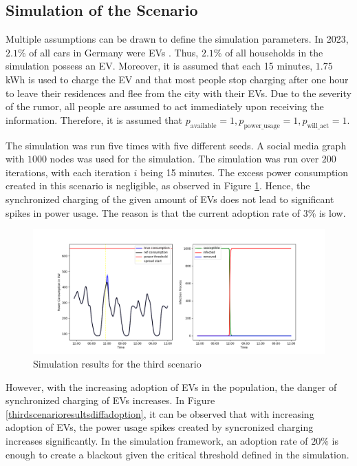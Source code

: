 \subsection{Simulation of the Scenario}

Multiple assumptions can be drawn to define the simulation parameters. 
In 2023, $2.1\%$ of all cars in Germany were 
EVs \cite{evadoption}. Thus, $2.1\%$ of all households in the simulation
possess an EV. Moreover, it is assumed that 
each 15 minutes, $1.75$kWh is used to charge the EV 
and that most people stop charging after one hour
to leave their residences and flee from the city with their EVs.
Due to the severity of the rumor,
all people are assumed to act immediately upon 
receiving the information. Therefore, it is assumed 
that $p_{\mathrm{available}}=1, 
p_{\mathrm{power\_usage}}=1, p_{\mathrm{will\_act}}=1$.


The simulation was run five times with five different seeds. 
A social media graph with $1000$ nodes was used for the simulation. 
The simulation was run over $200$ iterations, with each
iteration $i$ being 15 minutes.
The excess power consumption created in this scenario is negligible, 
as observed in Figure \ref{thirdscenarioresults}.  Hence, the 
synchronized charging of the given amount of EVs does not
lead to significant spikes in power usage.
The reason is that the current adoption rate of $3\%$ is low.

\begin{figure}[!ht]
    \center
    \includegraphics[scale=.5]{figs/eval/scenario3/scenario3basic.png}
    \caption{Simulation results for the third scenario}
    \label{thirdscenarioresults}
\end{figure}

However, with the increasing adoption of EVs in the 
population, the danger of synchronized charging 
of EVs increases. In Figure \ref{thirdscenarioresultsdiffadoption},
it can be observed that with increasing adoption of EVs,
the power usage spikes created by syncronized charging 
increases significantly. In the simulation framework,
an adoption rate of $20\%$ is enough to create a 
blackout given the critical threshold 
defined in the simulation.

